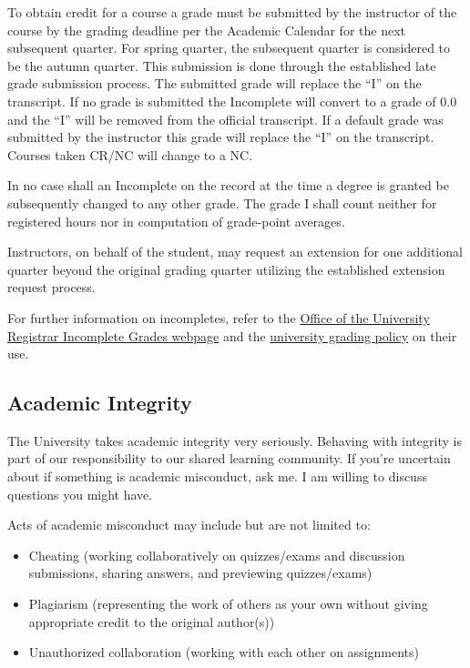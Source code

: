 \documentclass[12pt, letterpaper]{article}
\begin{document}
To obtain credit for a course a grade must be submitted by the instructor of the course by the grading deadline per the Academic Calendar for the next subsequent quarter. For spring quarter, the subsequent quarter is considered to be the autumn quarter. This submission is done through the established late grade submission process. The submitted grade will replace the “I” on the transcript. If no grade is submitted the Incomplete will convert to a grade of 0.0 and the “I” will be removed from the official transcript. If a default grade was submitted by the instructor this grade will replace the “I” on the transcript. Courses taken CR/NC will change to a NC.

In no case shall an Incomplete on the record at the time a degree is granted be subsequently changed to any other grade. The grade I shall count neither for registered hours nor in computation of grade-point averages.

Instructors, on behalf of the student, may request an extension for one additional quarter beyond the original grading quarter utilizing the established extension request process.

For further information on incompletes, refer to the \href{https://registrar.washington.edu/grades/incomplete-grade-policy/}{Office of the University Registrar Incomplete Grades webpage} and the \href{https://policy.uw.edu/directory/sgp/sgp-110-grades-honors-and-scholarship/#0}{university grading policy} on their use.

\subsection*{Academic Integrity}	\label{sec:academic_integrity}

The University takes academic integrity very seriously. Behaving with integrity is part of our responsibility to our shared learning community. If you’re uncertain about if something is academic misconduct, ask me. I am willing to discuss questions you might have.

Acts of academic misconduct may include but are not limited to:

\begin{itemize}
    \item Cheating (working collaboratively on quizzes/exams and discussion submissions, sharing answers, and previewing quizzes/exams)
    \item Plagiarism (representing the work of others as your own without giving appropriate credit to the original author(s))
    \item Unauthorized collaboration (working with each other on assignments)
\end{itemize}
\end{document}
